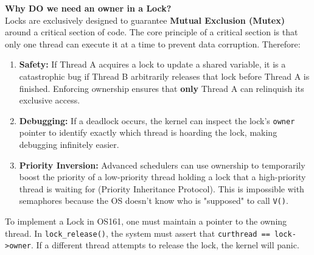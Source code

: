 \textbf{Why DO we need an owner in a Lock?}\\
Locks are exclusively designed to guarantee \textbf{Mutual Exclusion (Mutex)} around a critical section of code. The core principle of a critical section is that only one thread can execute it at a time to prevent data corruption. Therefore:
\begin{enumerate}
    \item \textbf{Safety:} If Thread A acquires a lock to update a shared variable, it is a catastrophic bug if Thread B arbitrarily releases that lock before Thread A is finished. Enforcing ownership ensures that \textbf{only} Thread A can relinquish its exclusive access.
    \item \textbf{Debugging:} If a deadlock occurs, the kernel can inspect the lock's \texttt{owner} pointer to identify exactly which thread is hoarding the lock, making debugging infinitely easier.
    \item \textbf{Priority Inversion:} Advanced schedulers can use ownership to temporarily boost the priority of a low-priority thread holding a lock that a high-priority thread is waiting for (Priority Inheritance Protocol). This is impossible with semaphores because the OS doesn't know who is "supposed" to call \texttt{V()}.
\end{enumerate}

To implement a Lock in OS161, one must maintain a pointer to the owning thread. In \texttt{lock\_release()}, the system must assert that \texttt{curthread == lock->owner}. If a different thread attempts to release the lock, the kernel will panic.

